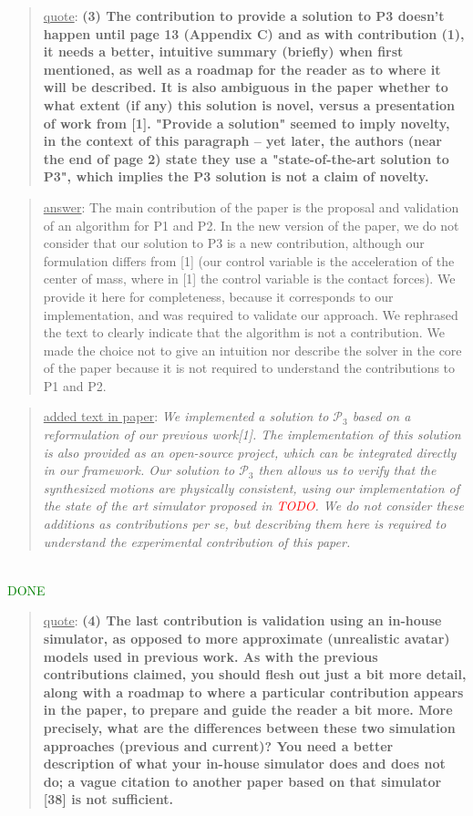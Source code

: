 \documentclass[a4paper]{article}
\newcommand{\done}[0]{\textcolor{green}{DONE}}
\newcommand\quot[1]{\begin{quote} \underline{quote}: \textbf{#1}\end{quote}}
\newcommand\as[1]{\begin{quote} \underline{answer}: {#1}\end{quote} }
\newcommand\qt[1]{\begin{quote} \underline{added text in paper}: \textit{#1}\end{quote} \leavevmode \\ }
\begin{document}
\quot{(3)	The contribution to provide a solution to P3 doesn't happen
until page 13 (Appendix C) and as with contribution (1), it needs a
better, intuitive summary (briefly) when first mentioned, as well as a
roadmap for the reader as to where it will be described. It is also
ambiguous in the paper whether to what extent (if any) this solution is
novel, versus a presentation of work from [1]. "Provide a solution"
seemed to imply novelty, in the context of this paragraph -- yet later,
the authors (near the end of page 2) state they use a "state-of-the-art
solution to P3", which implies the P3 solution is not a claim of
novelty.}

\as{The main contribution of the paper is the proposal and validation of an algorithm for P1 and P2. 
In the new version of the paper, we do not consider that our solution to P3
is a new contribution, although our formulation differs from [1] (our control variable is the acceleration
of the center of mass, where in [1] the control variable is the contact forces). We provide it here for completeness, because it corresponds to our implementation, and 
was required to validate our approach. 
We rephrased the text to clearly indicate that the algorithm is not a contribution. We made the choice not to give an intuition nor describe the solver in the core
of the paper because it is not required to understand the contributions to P1 and P2.}
\qt{ We implemented a solution to $\mathcal{P}_3$ based on a reformulation of our previous work[1]. The implementation of this solution is also provided as an open-source project, which can be integrated directly in our framework. Our solution to $\mathcal{P}_3$ then allows us to verify that the synthesized motions are physically consistent, using our implementation of the state of the art simulator proposed in \textcolor{red}{TODO}.
We do not consider these additions as contributions per se, but describing them here is required to understand the experimental contribution of this paper.}\done


\quot{
(4)	The last contribution is validation using an in-house
simulator, as opposed to more approximate (unrealistic avatar) models
used in previous work.	As with the previous contributions claimed, you
should flesh out just a bit more detail, along with a roadmap to where
a particular contribution appears in the paper, to prepare and guide
the reader a bit more. More precisely, what are the differences between
these two simulation approaches (previous and current)? You need a
better description of what your in-house simulator does and does not
do; a vague citation to another paper based on that simulator [38] is
not sufficient.}
\end{document}
